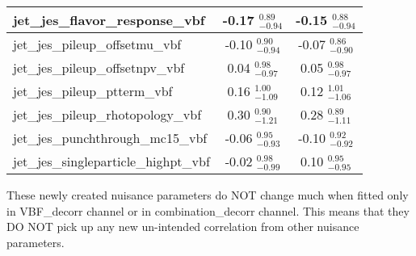 \documentclass{beamer}
\begin{document}
\begin{frame}
\begin{table}
{{\begin{tabular}{| l |c | c |}
jet\_jes\_flavor\_response\_vbf               &-0.17 \boldmath${^{ 0.89}_{-0.94}}$ &-0.15 \boldmath${^{ 0.88}_{-0.94}}$ \\\hline
jet\_jes\_pileup\_offsetmu\_vbf               &-0.10 \boldmath${^{ 0.90}_{-0.94}}$ &-0.07 \boldmath${^{ 0.86}_{-0.90}}$ \\\hline
jet\_jes\_pileup\_offsetnpv\_vbf              & 0.04 \boldmath${^{ 0.98}_{-0.97}}$ & 0.05 \boldmath${^{ 0.98}_{-0.97}}$ \\\hline
jet\_jes\_pileup\_ptterm\_vbf                 & 0.16 \boldmath${^{ 1.00}_{-1.09}}$ & 0.12 \boldmath${^{ 1.01}_{-1.06}}$\\\hline
jet\_jes\_pileup\_rhotopology\_vbf            & 0.30 \boldmath${^{ 0.90}_{-1.21}}$ & 0.28 \boldmath${^{ 0.89}_{-1.11}}$ \\\hline
jet\_jes\_punchthrough\_mc15\_vbf             &-0.06 \boldmath${^{ 0.95}_{-0.93}}$ &-0.10 \boldmath${^{ 0.92}_{-0.92}}$ \\\hline
jet\_jes\_singleparticle\_highpt\_vbf         &-0.02 \boldmath${^{ 0.98}_{-0.99}}$ & 0.10 \boldmath${^{ 0.95}_{-0.95}}$\\\hline

\end{tabular}
}}
\end{table}

These newly created nuisance parameters do NOT change much when fitted only in VBF\_decorr channel or in combination\_decorr channel.
This means that they DO NOT pick up any new un-intended correlation from other nuisance parameters.

\end{frame}
\end{document}
